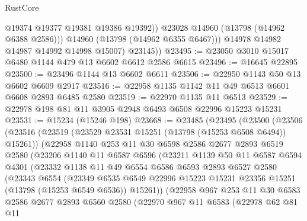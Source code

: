 \begin{lexlean}{RustCore}
\begin{coremodule}
                  @19374
                  @19377
                  @19381
                  @19386
                  @19392))
              @23028
              @14960
              (@13798 (@14962 @6388 @2586)))
            @14960
            (@13798 (@14962 @6355 @6467)))
          @14978
          @14982
          @14987
          @14992
          @14998
          @15007)
        @23145))
@23495 := @23050 @3010 @15017 @6480 @1144 @479 @13 @6602 @6612 @2586 @6615
@23496 := @16645 @22895
@23500 := @23496 @1144 @13 @6602 @6611
@23506 := @22950 @1143 @50 @13 @6602 @6609 @2917
@23516 := @22958 @1135 @1142 @11 @49 @6513 @6601 @6608 @2893 @6485 @2580
@23519 := @22970 @1135 @11 @6513
@23529 := @22978 @198 @81 @11 @3905 @2948 @6493 @6508 @22996 @15223 @15231
@23531 := @15234 (@15246 @198)
@23668 := @23485
    (@23495
      (@23500
        (@23506
          (@23516
            (@23519 (@23529 @23531 @15251 (@13798 (@15253 @6508 @6494)) @15261))
            (@22958
              @1140
              @253
              @11
              @30
              @6598
              @2586
              @2677
              @2893
              @6519
              @2580
              (@23206
                @1140
                @11
                @6587
                @6596
                (@23211
                  @1139
                  @50
                  @11
                  @6587
                  @6594
                  @4301
                  (@23332
                    @1138
                    @11
                    @49
                    @6554
                    @6586
                    @6593
                    @2893
                    @6527
                    @2580
                    (@23343
                      @6554
                      (@23349
                        @6535
                        @6549
                        @22996
                        @15223
                        @15231
                        @23356
                        @15251
                        (@13798 (@15253 @6549 @6536))
                        @15261))
                    (@22958
                      @967
                      @253
                      @11
                      @30
                      @6583
                      @2586
                      @2677
                      @2893
                      @6560
                      @2580
                      (@22970
                        @967
                        @11
                        @6583
                        (@22978
                          @62
                          @81
                          @11

\end{coremodule}
\end{lexlean}
